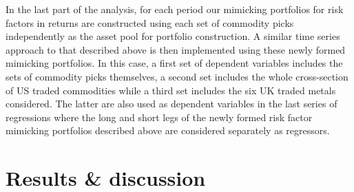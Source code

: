 \documentclass[12pt,]{article}
\begin{document}
In the last part of the analysis, for each period our mimicking
portfolios for risk factors in returns are constructed using each set of
commodity picks independently as the asset pool for portfolio
construction. A similar time series approach to that described above is
then implemented using these newly formed mimicking portfolios. In this
case, a first set of dependent variables includes the sets of commodity
picks themselves, a second set includes the whole cross-section of US
traded commodities while a third set includes the six UK traded metals
considered. The latter are also used as dependent variables in the last
series of regressions where the long and short legs of the newly formed
risk factor mimicking portfolios described above are considered
separately as regressors.

\hypertarget{results-discussion}{%
\section{Results \& discussion}\label{results-discussion}}
\end{document}
